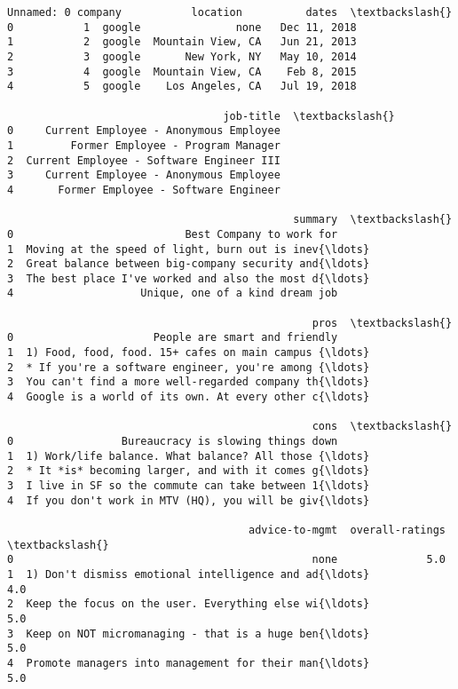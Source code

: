 \documentclass[11pt]{article}
\makeatletter
\newcommand{\boxspacing}{\kern\kvtcb@left@rule\kern\kvtcb@boxsep}
\newcommand{\prompt}[4]{
        \ttfamily\llap{{\color{#2}[#3]:\hspace{3pt}#4}}\vspace{-\baselineskip}
    }
\makeatother
\begin{document}
            \begin{tcolorbox}[breakable, size=fbox, boxrule=.5pt, pad at break*=1mm, opacityfill=0]
\prompt{Out}{outcolor}{213}{\boxspacing}
\begin{Verbatim}[commandchars=\\\{\}]
   Unnamed: 0 company           location          dates  \textbackslash{}
0           1  google               none   Dec 11, 2018
1           2  google  Mountain View, CA   Jun 21, 2013
2           3  google       New York, NY   May 10, 2014
3           4  google  Mountain View, CA    Feb 8, 2015
4           5  google    Los Angeles, CA   Jul 19, 2018

                                  job-title  \textbackslash{}
0     Current Employee - Anonymous Employee
1         Former Employee - Program Manager
2  Current Employee - Software Engineer III
3     Current Employee - Anonymous Employee
4       Former Employee - Software Engineer

                                             summary  \textbackslash{}
0                           Best Company to work for
1  Moving at the speed of light, burn out is inev{\ldots}
2  Great balance between big-company security and{\ldots}
3  The best place I've worked and also the most d{\ldots}
4                    Unique, one of a kind dream job

                                                pros  \textbackslash{}
0                      People are smart and friendly
1  1) Food, food, food. 15+ cafes on main campus {\ldots}
2  * If you're a software engineer, you're among {\ldots}
3  You can't find a more well-regarded company th{\ldots}
4  Google is a world of its own. At every other c{\ldots}

                                                cons  \textbackslash{}
0                 Bureaucracy is slowing things down
1  1) Work/life balance. What balance? All those {\ldots}
2  * It *is* becoming larger, and with it comes g{\ldots}
3  I live in SF so the commute can take between 1{\ldots}
4  If you don't work in MTV (HQ), you will be giv{\ldots}

                                      advice-to-mgmt  overall-ratings  \textbackslash{}
0                                               none              5.0
1  1) Don't dismiss emotional intelligence and ad{\ldots}              4.0
2  Keep the focus on the user. Everything else wi{\ldots}              5.0
3  Keep on NOT micromanaging - that is a huge ben{\ldots}              5.0
4  Promote managers into management for their man{\ldots}              5.0


\end{Verbatim}
\end{tcolorbox}
\end{document}
